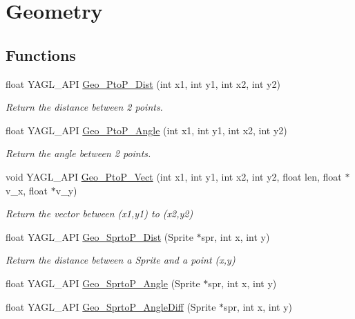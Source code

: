 \hypertarget{group____geo}{\section{Geometry}
\label{group____geo}
}
\subsection*{Functions}
\begin{DoxyCompactItemize}
\item 
float Y\-A\-G\-L\-\_\-\-A\-P\-I \hyperlink{group____geo_ga5e42d9cc9ddfa6dd30dffd8a7aa4461d}{Geo\-\_\-\-Pto\-P\-\_\-\-Dist} (int x1, int y1, int x2, int y2)
\begin{DoxyCompactList}\small\item\em Return the distance between 2 points. \end{DoxyCompactList}\item 
float Y\-A\-G\-L\-\_\-\-A\-P\-I \hyperlink{group____geo_gabfd075a6576d0464982e6844a93f0bc7}{Geo\-\_\-\-Pto\-P\-\_\-\-Angle} (int x1, int y1, int x2, int y2)
\begin{DoxyCompactList}\small\item\em Return the angle between 2 points. \end{DoxyCompactList}\item 
void Y\-A\-G\-L\-\_\-\-A\-P\-I \hyperlink{group____geo_gab5d2e68c9331685a4329d52c7f569ba4}{Geo\-\_\-\-Pto\-P\-\_\-\-Vect} (int x1, int y1, int x2, int y2, float len, float $\ast$v\-\_\-x, float $\ast$v\-\_\-y)
\begin{DoxyCompactList}\small\item\em Return the vector between (x1,y1) to (x2,y2) \end{DoxyCompactList}\item 
float Y\-A\-G\-L\-\_\-\-A\-P\-I \hyperlink{group____geo_ga2e179e8f64e4c26625dcc748adf51661}{Geo\-\_\-\-Sprto\-P\-\_\-\-Dist} (Sprite $\ast$spr, int x, int y)
\begin{DoxyCompactList}\small\item\em Return the distance between a Sprite and a point (x,y) \end{DoxyCompactList}\item 
float Y\-A\-G\-L\-\_\-\-A\-P\-I \hyperlink{group____geo_ga8feb4be971825161ced77eff747981f8}{Geo\-\_\-\-Sprto\-P\-\_\-\-Angle} (Sprite $\ast$spr, int x, int y)
\item 
float Y\-A\-G\-L\-\_\-\-A\-P\-I \hyperlink{group____geo_ga114cf0ff40272a00e93da00c99451fc9}{Geo\-\_\-\-Sprto\-P\-\_\-\-Angle\-Diff} (Sprite $\ast$spr, int x, int y)

\end{DoxyCompactItemize}
